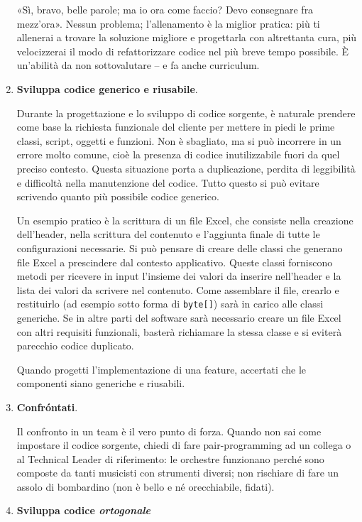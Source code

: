 \begin{enumerate}
«Sì, bravo, belle parole; ma io ora come faccio? Devo consegnare fra mezz’ora». Nessun problema; l’allenamento è la miglior pratica: più ti allenerai a trovare la soluzione migliore e progettarla con altrettanta cura, più velocizzerai il modo di refattorizzare codice nel più breve tempo possibile. È un’abilità da non sottovalutare – e fa anche curriculum.

\item \textbf{Sviluppa codice generico e riusabile}.

Durante la progettazione e lo sviluppo di codice sorgente, è naturale prendere come base la richiesta funzionale del cliente per mettere in piedi le prime classi, script, oggetti e funzioni. Non è sbagliato, ma si può incorrere in un errore molto comune, cioè la presenza di codice inutilizzabile fuori da quel preciso contesto. Questa situazione porta a duplicazione, perdita di leggibilità e difficoltà nella manutenzione del codice. Tutto questo si può evitare scrivendo quanto più possibile codice generico.

Un esempio pratico è la scrittura di un file Excel, che consiste nella creazione dell’header, nella scrittura del contenuto e l’aggiunta finale di tutte le configurazioni necessarie. Si può pensare di creare delle classi che generano file Excel a prescindere dal contesto applicativo. Queste classi forniscono metodi per ricevere in input l’insieme dei valori da inserire nell’header e la lista dei valori da scrivere nel contenuto. Come assemblare il file, crearlo e restituirlo (ad esempio sotto forma di \texttt{byte[]}) sarà in carico alle classi generiche. Se in altre parti del software sarà necessario creare un file Excel con altri requisiti funzionali, basterà richiamare la stessa classe e si eviterà parecchio codice duplicato.

Quando progetti l’implementazione di una feature, accertati che le componenti siano generiche e riusabili.

\item \textbf{Confróntati}.

Il confronto in un team è il vero punto di forza. Quando non sai come impostare il codice sorgente, chiedi di fare pair-programming ad un collega o al Technical Leader di riferimento: le orchestre funzionano perché sono composte da tanti musicisti con strumenti diversi; non rischiare di fare un assolo di bombardino (non è bello e né orecchiabile, fidati).

\item \textbf{Sviluppa codice \emph{ortogonale}} 


\end{enumerate}
